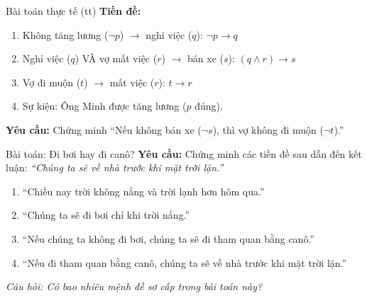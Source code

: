 \documentclass[aspectratio=169, 11pt]{beamer}
\begin{document}
\begin{frame}{Bài toán thực tế (tt)}
\textbf{Tiền đề:}

\vspace{0.15cm}
\begin{enumerate}
  \item[\textcolor{uitblue}{1.}] Không tăng lương ($\neg p$) $\rightarrow$ nghỉ việc ($q$): $\neg p \rightarrow q$
  \item[\textcolor{uitblue}{2.}] Nghỉ việc ($q$) VÀ vợ mất việc ($r$) $\rightarrow$ bán xe ($s$): $(q \land r) \rightarrow s$
  \item[\textcolor{uitblue}{3.}] Vợ đi muộn ($t$) $\rightarrow$ mất việc ($r$): $t \rightarrow r$
  \item[\textcolor{uitblue}{4.}] Sự kiện: Ông Minh được tăng lương ($p$ đúng).
\end{enumerate}

\vspace{0.35cm}
\textbf{Yêu cầu:} Chứng minh ``Nếu không bán xe ($\neg s$), thì vợ không đi muộn ($\neg t$).''
\end{frame}

\begin{frame}{Bài toán: Đi bơi hay đi canô?}
\textbf{Yêu cầu:} Chứng minh các tiền đề sau dẫn đến kết luận: \textit{``Chúng ta sẽ về nhà trước khi mặt trời lặn.''}

\vspace{0.2cm}
\begin{enumerate}
  \item[\textcolor{uitblue}{1.}] ``Chiều nay trời không nắng và trời lạnh hơn hôm qua.''
  \item[\textcolor{uitblue}{2.}] ``Chúng ta sẽ đi bơi chỉ khi trời nắng.''
  \item[\textcolor{uitblue}{3.}] ``Nếu chúng ta không đi bơi, chúng ta sẽ đi tham quan bằng canô.''
  \item[\textcolor{uitblue}{4.}] ``Nếu đi tham quan bằng canô, chúng ta sẽ về nhà trước khi mặt trời lặn.''
\end{enumerate}

\vspace{0.3cm}
\textit{Câu hỏi: Có bao nhiêu mệnh đề sơ cấp trong bài toán này?}
\end{frame}
\end{document}
